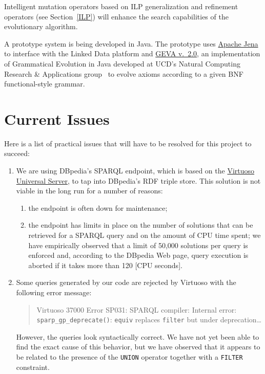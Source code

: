 \documentclass[a4paper]{article}
\newcounter{ex}
\begin{document}
Intelligent mutation operators based on ILP generalization and refinement operators
(see Section~\ref{ILP}) will enhance the search capabilities of the evolutionary algorithm.

A prototype system is being developed in Java.
The prototype uses \href{http://jena.apache.org/}{Apache Jena} to interface with
the Linked Data platform and
\href{http://ncra.ucd.ie/Site/GEVA.html}{GEVA v.~2.0},
an implementation of Grammatical Evolution in Java
developed at UCD's Natural Computing Research \& Applications
group~\cite{ONeillHembergGilliganBartleyMcDermottBrabazon2008}
to evolve axioms according to a given BNF functional-style grammar.

\section{Current Issues}

Here is a list of practical issues that will have to be resolved for this project
to succeed:
\begin{enumerate}
\item We are using DBpedia's SPARQL endpoint, which is based on the
  \href{http://virtuoso.openlinksw.com/}{Virtuoso Universal Server},
  to tap into DBpedia's RDF triple store. This solution is not viable in the
  long run for a number of reasons:
  \begin{enumerate}
  \item the endpoint is often down for maintenance;
  \item the endpoint has limits in place on the number of solutions that can be
    retrieved for a SPARQL query and on the amount of CPU time spent;
    we have empirically observed that a limit of 50,000 solutions per query is enforced
    and, according to the DBpedia Web page, query execution is aborted if it takes
    more than 120 [CPU seconds].
  \end{enumerate}
  \item Some queries generated by our code are rejected by Virtuoso with the
    following error message:
    \begin{quote}
      Virtuoso 37000 Error SP031: SPARQL compiler: Internal error:
      \texttt{sparp\_gp\_deprecate()}: \texttt{equiv} replaces \texttt{filter}
      but under deprecation\dots
    \end{quote}
    However, the queries look syntactically correct. We have not yet been able
    to find the exact cause of this behavior, but we have observed that it appears
    to be related to the presence of the \texttt{UNION} operator together with
    a \texttt{FILTER} constraint.
\end{enumerate}
\end{document}
